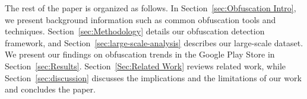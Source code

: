 The rest of the paper is organized as follows. In Section~\ref{sec:Obfuscation Intro}, we present background information such as common obfuscation tools and techniques. Section~\ref{sec:Methodology} details our obfuscation detection framework, and Section~\ref{sec:large-scale-analysis} describes our large-scale dataset. We present our findings on obfuscation trends in the Google Play Store in Section~\ref{sec:Results}. Section~\ref{Sec:Related Work} reviews related work, while Section~\ref{sec:discussion} discusses the implications and the limitations of our work and concludes the paper.